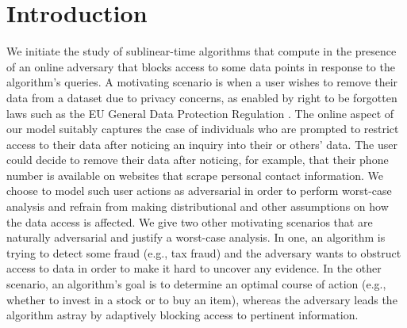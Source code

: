 \documentclass{toc}
\begin{document}
%
%
%

\section{Introduction}

	   
We initiate the study of sublinear-time algorithms that compute in the presence of an online adversary that blocks access to some data points in response to the algorithm's queries. A motivating scenario is when a user wishes to remove their data from a dataset due to privacy concerns, as enabled by right to be forgotten laws such as the EU General Data Protection Regulation \cite{Mantelero13}. 
The online aspect of our model suitably captures the case of individuals who are prompted to restrict access to their data after noticing an inquiry into their or others' data. The user could decide to remove their data after noticing, for example, that their phone number is available on websites that scrape personal contact information.
We choose to model such user actions as adversarial in order to perform worst-case analysis and refrain from making distributional and other assumptions on how the data access is affected. We give two other motivating scenarios that are naturally adversarial and justify a worst-case analysis. In one, an  algorithm is trying to detect some fraud (e.g., tax fraud) and the adversary wants to obstruct access to data in order to make it hard to uncover any evidence. In the other scenario, an algorithm's goal is to determine an optimal course of action (e.g., whether to invest in a stock or to buy an item), whereas the adversary leads the algorithm astray by adaptively blocking access to pertinent information. 
\end{document}
